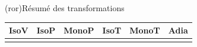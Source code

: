 \documentclass[../../main/main.tex]{subfiles}
\begin{document}
\begin{tcb*}[sidebyside, righthand ratio=.30](ror){Résumé des transformations}
	\begin{center}
		\begin{tabular}{cccccc}
			\toprule
			\textbf{IsoV}             &
			\textbf{IsoP}             &
			\textbf{MonoP}            &
			\textbf{IsoT}             &
			\textbf{MonoT}            &
			\textbf{Adia}
			\\
			\midrule
			\psw{$\dd{V} = 0$}        &
			\psw{$\dd{P} = 0$}        &
			\psw{$P\ind{ext} = \cte$} &
			\psw{$\dd{T} = 0$}        &
			\psw{$T\ind{ext} = \cte$} &
			\psw{$Q = 0$}
			\\
			\bottomrule
		\end{tabular}
	\end{center}
	\tcblower
	\begin{center}
\end{center}
\end{tcb*}
\end{document}
